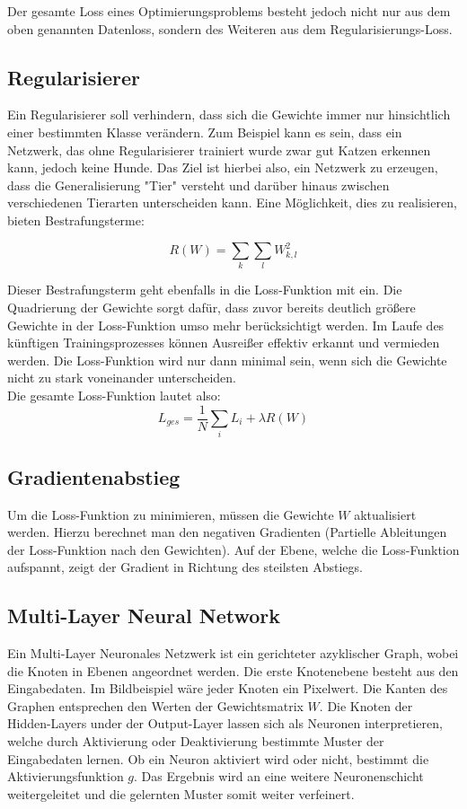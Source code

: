 \documentclass[11pt,fleqn]{book}
\begin{document}
Der gesamte Loss eines Optimierungsproblems besteht jedoch nicht nur aus dem oben genannten Datenloss, sondern des Weiteren aus dem Regularisierungs-Loss.

\subsection{Regularisierer}
Ein Regularisierer soll verhindern, dass sich die Gewichte immer nur hinsichtlich einer bestimmten Klasse verändern. Zum Beispiel kann es sein, dass ein Netzwerk, das ohne Regularisierer trainiert wurde zwar gut Katzen erkennen kann, jedoch keine Hunde. Das Ziel ist hierbei also, ein Netzwerk zu erzeugen, dass die Generalisierung "Tier" versteht und darüber hinaus zwischen verschiedenen Tierarten unterscheiden kann. Eine Möglichkeit, dies zu realisieren, bieten Bestrafungsterme:

\[R(W) = \sum_{k}\sum_{l} W_{k,l}^2\]

Dieser Bestrafungsterm geht ebenfalls in die Loss-Funktion mit ein. Die Quadrierung der Gewichte sorgt dafür, dass zuvor bereits deutlich größere Gewichte in der Loss-Funktion umso mehr berücksichtigt werden. Im Laufe des künftigen Trainingsprozesses können Ausreißer effektiv erkannt und vermieden werden. Die Loss-Funktion wird nur dann minimal sein, wenn sich die Gewichte nicht zu stark voneinander unterscheiden.
\\
Die gesamte Loss-Funktion lautet also:
\[L_{ges} = \frac{1}{N} \sum_{i} L_i + \lambda R(W)\]

\subsection{Gradientenabstieg}
Um die Loss-Funktion zu minimieren, müssen die Gewichte $W$ aktualisiert werden. Hierzu berechnet man den negativen Gradienten (Partielle Ableitungen der Loss-Funktion nach den Gewichten). Auf der Ebene, welche die Loss-Funktion aufspannt, zeigt der Gradient in Richtung des steilsten Abstiegs.


\subsection{Multi-Layer Neural Network}
Ein Multi-Layer Neuronales Netzwerk ist ein gerichteter azyklischer Graph, wobei die Knoten in Ebenen angeordnet werden. Die erste Knotenebene besteht aus den Eingabedaten. Im Bildbeispiel wäre jeder Knoten ein Pixelwert. Die Kanten des Graphen entsprechen den Werten der Gewichtsmatrix $W$. Die Knoten der Hidden-Layers under der Output-Layer lassen sich als Neuronen interpretieren, welche durch Aktivierung oder Deaktivierung bestimmte Muster der Eingabedaten lernen. Ob ein Neuron aktiviert wird oder nicht, bestimmt die Aktivierungsfunktion $g$. Das Ergebnis wird an eine weitere Neuronenschicht weitergeleitet und die gelernten Muster somit weiter verfeinert.
\end{document}
